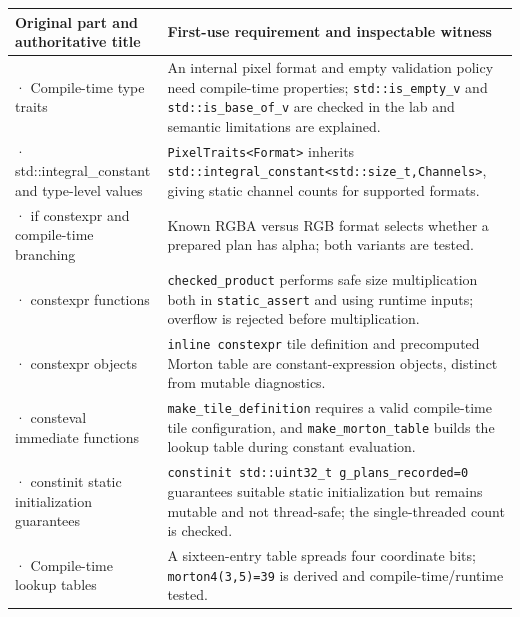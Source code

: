 {\def\LTcaptype{none} %
\begin{longtable}[]{@{}
  >{\raggedright\arraybackslash}p{}
  >{\raggedright\arraybackslash}p{}@{}}
\toprule\noalign{}
\begin{minipage}[b]{\linewidth}\raggedright
Original part and authoritative title
\end{minipage} & \begin{minipage}[b]{\linewidth}\raggedright
First-use requirement and inspectable witness
\end{minipage} \\
\midrule\noalign{}
\endhead
\bottomrule\noalign{}
\endlastfoot
217 · Compile-time type traits & An internal pixel format and empty validation policy need compile-time properties; \texttt{std::is\_empty\_v} and \texttt{std::is\_base\_of\_v} are checked in the lab and semantic limitations are explained. \\
218 · std::integral\_constant and type-level values & \texttt{PixelTraits\textless{}Format\textgreater{}} inherits \texttt{std::integral\_constant\textless{}std::size\_t,Channels\textgreater{}}, giving static channel counts for supported formats. \\
219 · if constexpr and compile-time branching & Known RGBA versus RGB format selects whether a prepared plan has alpha; both variants are tested. \\
220 · constexpr functions & \texttt{checked\_product} performs safe size multiplication both in \texttt{static\_assert} and using runtime inputs; overflow is rejected before multiplication. \\
221 · constexpr objects & \texttt{inline\ constexpr} tile definition and precomputed Morton table are constant-expression objects, distinct from mutable diagnostics. \\
222 · consteval immediate functions & \texttt{make\_tile\_definition} requires a valid compile-time tile configuration, and \texttt{make\_morton\_table} builds the lookup table during constant evaluation. \\
223 · constinit static initialization guarantees & \texttt{constinit\ std::uint32\_t\ g\_plans\_recorded=0} guarantees suitable static initialization but remains mutable and not thread-safe; the single-threaded count is checked. \\
224 · Compile-time lookup tables & A sixteen-entry table spreads four coordinate bits; \texttt{morton4(3,5)=39} is derived and compile-time/runtime tested. \\

\end{longtable}}
